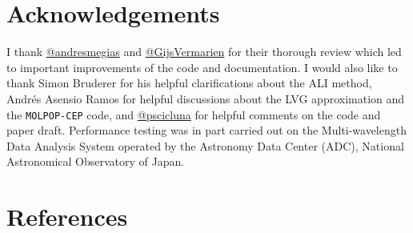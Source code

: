 \documentclass[
]{article}
\begin{document}
\section{Acknowledgements}\label{acknowledgements}

I thank \href{https://github.com/andresmegias}{@andresmegias} and
\href{https://github.com/GijsVermarien}{@GijsVermarien} for their
thorough review which led to important improvements of the code and
documentation. I would also like to thank Simon Bruderer for his helpful
clarifications about the ALI method, Andrés Asensio Ramos for helpful
discussions about the LVG approximation and the \texttt{MOLPOP-CEP}
code, and \href{https://github.com/pscicluna}{@pscicluna} for helpful
comments on the code and paper draft. Performance testing was in part
carried out on the Multi-wavelength Data Analysis System operated by the
Astronomy Data Center (ADC), National Astronomical Observatory of Japan.

\section*{References}\label{references}
\end{document}
